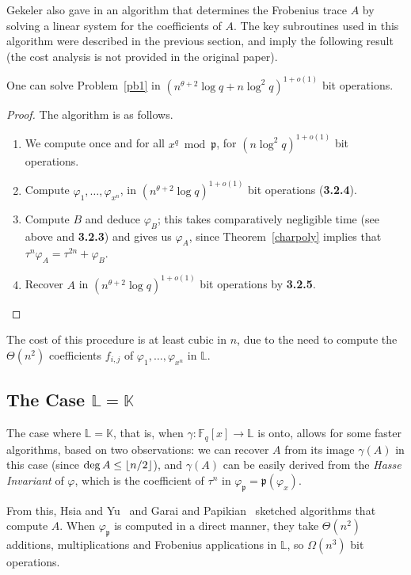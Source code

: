 \documentclass[sigconf]{acmart}
\newcommand{\K}{\mathbb{K}}
\newcommand{\F}{\mathbb{F}}
\renewcommand{\L}{\mathbb{L}}
\newcommand{\frakp}{\mathfrak{p}}
\DeclarePairedDelimiter\floor{\lfloor}{\rfloor}
\begin{document}
Gekeler also gave in \cite[Sec.~3]{frobdist} an algorithm that
determines the Frobenius trace $A$ by solving a linear system for the
coefficients of $A$. The key subroutines used in this algorithm were
described in the previous section, and imply the following result (the
cost analysis is not provided in the original paper).
\begin{proposition}\label{prop:gek}
  One can solve Problem~\ref{pb1} in $(n^{\theta+2}\log
  q + n \log^2 q)^{1+o(1)}$ bit operations.
\end{proposition}
\begin{proof}
The algorithm is as follows.
\begin{enumerate}
\item We compute once and for all $x^q\bmod \frakp$, for $(n \log^2
  q)^{1+o(1)}$ bit operations.
\item Compute $\varphi_1,\dots,\varphi_{x^n}$, in
$(n^{\theta+2} \log q)^{1+o(1)}$ bit operations ({\bf 3.2.4}).
\item Compute $B$ and deduce $\varphi_B$; this takes comparatively
  negligible time (see above and {\bf 3.2.3}) and gives us
  $\varphi_A$, since Theorem~\ref{charpoly} implies that $\tau^n
  \varphi_A = \tau^{2n} + \varphi_B.$
\item Recover $A$ in $(n^{\theta+2} \log q)^{1+o(1)}$
bit operations by {\bf 3.2.5}. \qedhere
\end{enumerate}
\end{proof}
The cost of this procedure is at least cubic in $n$, due to the need
to compute the $\Theta(n^2)$ coefficients $f_{i,j}$ of
$\varphi_1,\dots,\varphi_{x^n}$ in $\L$.


\subsection{The Case $\L = \K$}

The case where $\L = \K$, that is, when $\gamma: \F_q[x] \to \L$ is
onto, allows for some faster algorithms, based on two observations:
we can recover $A$ from its image $\gamma(A)$ in this case (since
 $\deg A \le \floor*{n/2}$), and $\gamma(A)$ can be easily
derived from the {\em Hasse Invariant} of $\varphi$, which is the
coefficient of $\tau^{n}$ in $\varphi_{\frakp}={\frakp}(\varphi_x)$.

From this, Hsia and Yu~\cite{HsYu00} and Garai and
Papikian~\cite{GaPa18} sketched algorithms that compute $A$.  When
$\varphi_{\frakp}$ is computed in a direct manner, they take
$\Theta(n^2)$ additions, multiplications and Frobenius applications in
$\L$, so $\Omega(n^3)$ bit operations.
\end{document}
